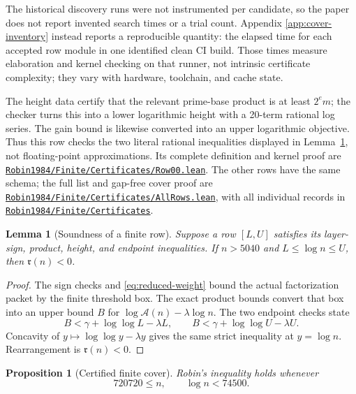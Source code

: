 \documentclass[11pt]{amsart}
\newtheorem{proposition}[theorem]{Proposition}
\newtheorem{lemma}[theorem]{Lemma}
\theoremstyle{definition}
\theoremstyle{remark}
\numberwithin{equation}{section}
\newcommand{\euler}{\gamma}
\newcommand{\A}{\mathcal{A}}
\newcommand{\M}{\mathfrak r}
\newcommand{\repositoryurl}{https://github.com/kimihiro64/Robin1984}
\newcommand{\proofrevision}{b359826e62c50b6cef55db4b2fcab793232498cc}
\newcommand{\codefile}[1]{%
  \href{\repositoryurl/blob/\proofrevision/#1}{\nolinkurl{#1}}}
\newcommand{\codedir}[1]{%
  \href{\repositoryurl/tree/\proofrevision/#1}{\nolinkurl{#1}}}
\begin{document}
The historical discovery runs were not instrumented per candidate, so the
paper does not report invented search times or a trial count.  Appendix
\ref{app:cover-inventory} instead reports a reproducible quantity: the elapsed
time for each accepted row module in one identified clean CI build.  Those
times measure elaboration and kernel checking on that runner, not intrinsic
certificate complexity; they vary with hardware, toolchain, and cache state.

The height data certify that the relevant prime-base product is at least
$2^e m$; the checker turns this into a lower logarithmic height with a
20-term rational log series.  The gain bound is likewise converted into an
upper logarithmic objective.  Thus this row checks the two literal rational
inequalities displayed in Lemma~\ref{lem:row-sound}, not floating-point
approximations.  Its complete definition and kernel proof are
\codefile{Robin1984/Finite/Certificates/Row00.lean}.  The other rows have the
same schema; the full list and gap-free cover proof are
\codefile{Robin1984/Finite/Certificates/AllRows.lean}, with all individual
records in \codedir{Robin1984/Finite/Certificates}.

\begin{lemma}[Soundness of a finite row]\label{lem:row-sound}
Suppose a row $[L,U]$ satisfies its layer-sign, product, height, and endpoint
inequalities.  If $n>5040$ and $L\le\log n\le U$, then $\M(n)<0$.
\end{lemma}

\begin{proof}
The sign checks and \eqref{eq:reduced-weight} bound the actual factorization
packet by the finite threshold box.  The exact product bounds convert that
box into an upper bound $B$ for
$\log\A(n)-\lambda\log n$.  The two endpoint checks state
\[
  B<\euler+\log\log L-\lambda L,
  \qquad
  B<\euler+\log\log U-\lambda U.
\]
Concavity of $y\mapsto\log\log y-\lambda y$ gives the same strict inequality
at $y=\log n$.  Rearrangement is $\M(n)<0$.
\end{proof}

\begin{proposition}[Certified finite cover]\label{prop:finite-cover}
Robin's inequality holds whenever
\begin{equation}\label{eq:finite-log-range}
  720720\le n,
  \qquad
  \log n<74500.
\end{equation}
\end{proposition}
\end{document}
